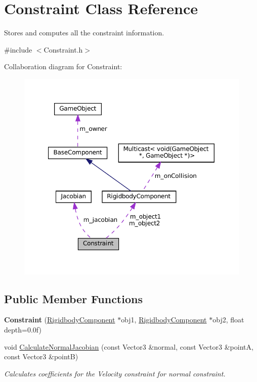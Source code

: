 \hypertarget{classConstraint}{}\section{Constraint Class Reference}
\label{classConstraint}


Stores and computes all the constraint information.  




{\ttfamily \#include $<$Constraint.\+h$>$}



Collaboration diagram for Constraint\+:
\nopagebreak
\begin{figure}[H]
\begin{center}
\leavevmode
\includegraphics[width=350pt]{classConstraint__coll__graph}
\end{center}
\end{figure}
\subsection*{Public Member Functions}
\begin{DoxyCompactItemize}
\item 
\mbox{\label{classConstraint_a395b6ff4b983af67254c5dfe9fdf6bb9}} 
{\bfseries Constraint} (\hyperlink{classRigidbodyComponent}{Rigidbody\+Component} $\ast$obj1, \hyperlink{classRigidbodyComponent}{Rigidbody\+Component} $\ast$obj2, float depth=0.\+0f)
\item 
void \hyperlink{classConstraint_a4b19008d8d9a6965bfc90111e5cc4efd}{Calculate\+Normal\+Jacobian} (const Vector3 \&normal, const Vector3 \&pointA, const Vector3 \&pointB)
\begin{DoxyCompactList}\small\item\em Calculates coefficients for the Velocity constraint for normal constraint. \end{DoxyCompactList}\end{DoxyCompactItemize}
